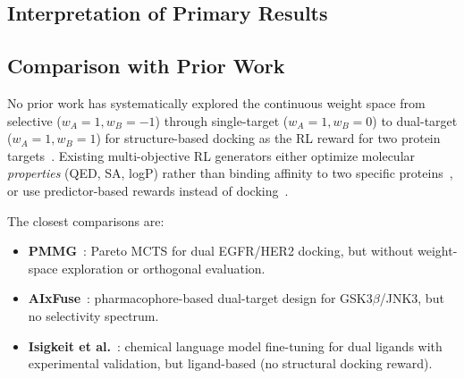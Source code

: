 

\subsection{Interpretation of Primary Results}


\subsection{Comparison with Prior Work}

No prior work has systematically explored the continuous weight space
from selective ($w_A = 1, w_B = -1$) through single-target
($w_A = 1, w_B = 0$) to dual-target ($w_A = 1, w_B = 1$) for
structure-based docking as the RL reward for two protein
targets~\citep{fromer2023moo, loeffler2024reinvent4}.
Existing multi-objective RL generators either optimize molecular
\emph{properties} (QED, SA, logP) rather than binding affinity to
two specific proteins~\citep{jain2023mogfn, wang2024scarlp},
or use predictor-based rewards instead of
docking~\citep{ren2024polygon, zhang2024clm}.

The closest comparisons are:
\begin{itemize}
\item \textbf{PMMG}~\citep{pmmg2025}: Pareto MCTS for dual EGFR/HER2
  docking, but without weight-space exploration or orthogonal evaluation.
\item \textbf{AIxFuse}~\citep{chen2024aixfuse}: pharmacophore-based
  dual-target design for GSK3$\beta$/JNK3, but no selectivity spectrum.
\item \textbf{Isigkeit et al.}~\citep{isigkeit2024clm}: chemical language
  model fine-tuning for dual ligands with experimental validation, but
  ligand-based (no structural docking reward).
\end{itemize}

